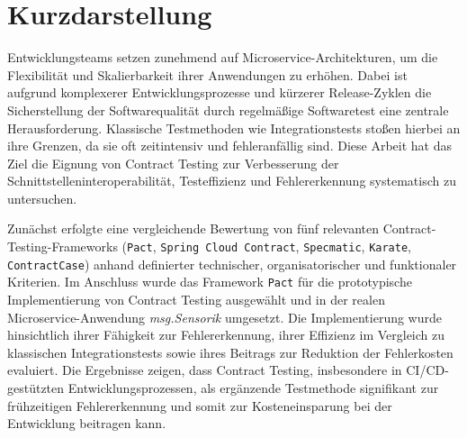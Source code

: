 \thispagestyle{empty}
\section*{Kurzdarstellung}\label{sec:kurzdarstellung}

Entwicklungsteams setzen zunehmend auf Microservice-Architekturen, um die Flexibilität und Skalierbarkeit ihrer Anwendungen zu erhöhen.
Dabei ist aufgrund komplexerer Entwicklungsprozesse und kürzerer Release-Zyklen die Sicherstellung der Softwarequalität durch regelmäßige Softwaretest eine zentrale Herausforderung.
Klassische Testmethoden wie Integrationstests stoßen hierbei an ihre Grenzen, da sie oft zeitintensiv und fehleranfällig sind.
Diese Arbeit hat das Ziel die Eignung von Contract Testing zur Verbesserung der Schnittstelleninteroperabilität, Testeffizienz und Fehlererkennung systematisch zu untersuchen.

Zunächst erfolgte eine vergleichende Bewertung von fünf relevanten Contract-\-Testing-\-Frame\-works (\texttt{Pact}, \texttt{Spring Cloud Contract}, \texttt{Specmatic}, \texttt{Karate}, \texttt{ContractCase}) anhand definierter technischer, organisatorischer und funktionaler Kriterien.
Im Anschluss wurde das Framework \texttt{Pact} für die prototypische Implementierung von Contract Testing ausgewählt und in der realen Microservice-Anwendung \textit{msg.Sensorik} umgesetzt.
Die Implementierung wurde hinsichtlich ihrer Fähigkeit zur Fehlererkennung, ihrer Effizienz im Vergleich zu klassischen Integrationstests sowie ihres Beitrags zur Reduktion der Fehlerkosten evaluiert.
Die Ergebnisse zeigen, dass Contract Testing, insbesondere in CI/CD-gestützten Entwicklungsprozessen, als ergänzende Testmethode signifikant zur frühzeitigen Fehlererkennung und somit zur Kosteneinsparung bei der Entwicklung beitragen kann.